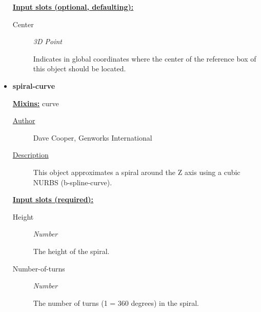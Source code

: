 \documentclass [11pt]{book}
\begin{document}
\begin{itemize}
\textbf{
\underline{Input slots (optional, defaulting):}}

\begin{description}

\item [Center]
\emph{3D Point}

 Indicates in global coordinates where the center of the reference
box of this object should be located.




\end{description}







\item {}
\label{prim:spiral-curve}
\textbf{spiral-curve}


\textbf{
\underline{Mixins:}} curve





\begin{description}

\item [
\underline{Author}]


Dave Cooper, Genworks International



\item [
\underline{Description}]


This object approximates a spiral around the Z axis using a cubic NURBS (b-spline-curve).



\end{description}








\textbf{
\underline{Input slots (required):}}

\begin{description}

\item [Height]
\emph{Number}

 The height of the spiral.




\item [Number-of-turns]
\emph{Number}

 The number of turns (1 = 360 degrees) in the spiral.





\end{description}
\end{itemize}
\end{document}
